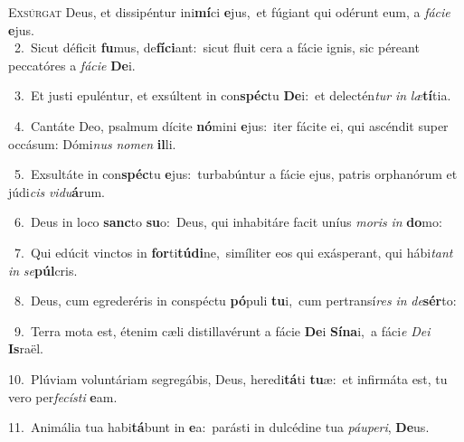 \lettrine{\initial\textcolor{\initialcolor}{E}}{xsúrgat} Deus, et dissipéntur ini\-\textbf{mí}\-ci \textbf{e}\-jus,~\star et fúgiant qui odérunt eum, a \textit{fá}\-\textit{ci}\textit{e} \textbf{e}\-jus.\\
{\numbfont\textcolor{\numbcolor}{~2.}}~Sicut déficit \textbf{fu}\-mus, de\-\textbf{fí}\-\textbf{ci}ant:~\star sicut fluit cera a fácie ignis, sic péreant peccatóres a \textit{fá}\-\textit{ci}\textit{e} \textbf{De}\-i.\par
{\numbfont\textcolor{\numbcolor}{~3.}}~Et justi epuléntur, et exsúltent in con\-\textbf{spéc}\-tu \textbf{De}\-i:~\star et delectén\textit{tur} \textit{in} \textit{læ}\-\textbf{tí}tia.\par
{\numbfont\textcolor{\numbcolor}{~4.}}~Cantáte Deo, psalmum dícite \textbf{nó}\-mini \textbf{e}\-jus:~\star iter fácite ei, qui ascéndit super occásum: Dómi\textit{nus} \textit{no}\-\textit{men} \textbf{il}\-li.\par
{\numbfont\textcolor{\numbcolor}{~5.}}~Exsultáte in con\-\textbf{spéc}\-tu \textbf{e}\-jus:~\star turbabúntur a fácie ejus, patris orphanórum et júdi\textit{cis} \textit{vi}\-\textit{du}\textbf{á}rum.\par
{\numbfont\textcolor{\numbcolor}{~6.}}~Deus in loco \textbf{sanc}\-to \textbf{su}\-o:~\star Deus, qui inhabitáre facit uníus \textit{mo}\-\textit{ris} \textit{in} \textbf{do}\-mo:\par
{\numbfont\textcolor{\numbcolor}{~7.}}~Qui edúcit vinctos in \textbf{for}\-ti\-\textbf{tú}\-\textbf{di}ne,~\star simíliter eos qui exásperant, qui hábi\textit{tant} \textit{in} \textit{se}\-\textbf{púl}cris.\par
{\numbfont\textcolor{\numbcolor}{~8.}}~Deus, cum egrederéris in conspéctu \textbf{pó}\-puli \textbf{tu}\-i,~\star cum pertransí\textit{res} \textit{in} \textit{de}\-\textbf{sér}to:\par
{\numbfont\textcolor{\numbcolor}{~9.}}~Terra mota est, étenim cæli distillavérunt a fácie \textbf{De}\-i \textbf{Sí}\-\textbf{na}i,~\star a fáci\textit{e} \textit{De}\-\textit{i} \textbf{Is}\-raël.\par
{\numbfont\textcolor{\numbcolor}{10.}}~Plúviam voluntáriam segregábis, Deus, heredi\-\textbf{tá}\-ti \textbf{tu}\-æ:~\star et infirmáta est, tu vero per\-\textit{fe}\-\textit{cís}\textit{ti} \textbf{e}\-am.\par
{\numbfont\textcolor{\numbcolor}{11.}}~Animália tua habi\-\textbf{tá}\-bunt in \textbf{e}\-a:~\star parásti in dulcédine tua \textit{páu}\-\textit{pe}\textit{ri}, \textbf{De}\-us.\par
